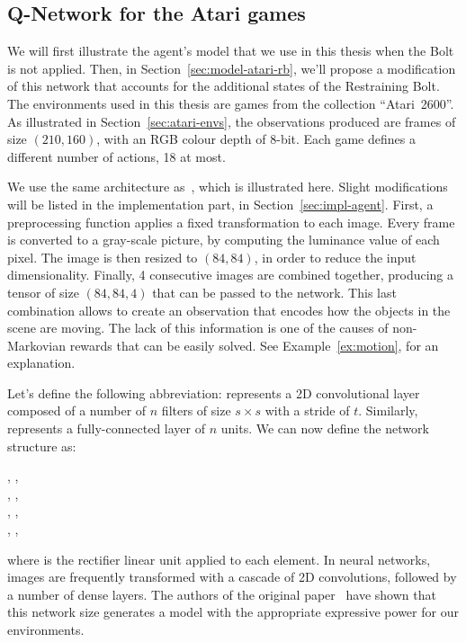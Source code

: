 \subsection{Q-Network for the Atari games}

\label{sec:model-atari}

We will first illustrate the agent's model that we use in this thesis when the
Bolt is not applied. Then, in Section~\ref{sec:model-atari-rb}, we'll propose
a modification of this network that accounts for the additional states of the
Restraining Bolt.  The environments used in this thesis are games from the
collection ``Atari~2600''.  As illustrated in Section~\ref{sec:atari-envs},
the observations produced are frames of size $(210, 160)$, with an RGB colour
depth of 8-bit. Each game defines a different number of actions, 18 at most.

We use the same architecture as~\cite{bib:atari-deepq-nature}, which is
illustrated here. Slight modifications will be listed in the implementation
part, in Section~\ref{sec:impl-agent}. First, a preprocessing function applies
a fixed transformation to each image. Every frame is converted to a gray-scale
picture, by computing the luminance value of each pixel. The image is then
resized to $(84, 84)$, in order to reduce the input dimensionality. Finally, 4
consecutive images are combined together, producing a tensor of size $(84, 84,
4)$ that can be passed to the network. This last combination allows to create
an observation that encodes how the objects in the scene are moving. The lack
of this information is one of the causes of non-Markovian rewards that can be
easily solved. See Example~\ref{ex:motion}, for an explanation.

Let's define the following abbreviation:  represents
a 2D convolutional layer composed of a number of $n$ filters of size $s \times
s$ with a stride of $t$. Similarly,  represents a
fully-connected layer of $n$ units. We can now define the network structure
as:
\begin{center}
	, \relu{}, \\
	, \relu{}, \\
	, \relu{}, \\
	, \relu{}, \\
\end{center}
where \relu{} is the rectifier linear unit applied to each element. In neural
networks, images are frequently transformed with a cascade of 2D convolutions,
followed by a number of dense layers. The authors of the original
paper~\cite{bib:atari-deepq-nature} have shown that this network size
generates a model with the appropriate expressive power for our environments.


